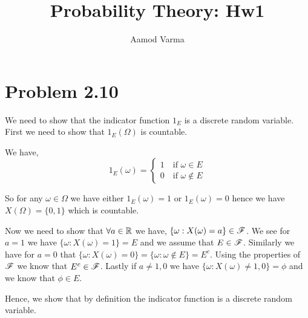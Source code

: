 \documentclass[a4paper]{report}
\title{Probability Theory: Hw1}
\author{Aamod Varma}
\begin{document}
\maketitle
\date{}

\section*{Problem 2.10}
We need to show that the indicator function $1_E$ is a discrete random variable. First we need to show that $1_E(\Omega)$ is countable. 

\vspace{1em}

We have, 
$$ 1_E(\omega) = \begin{cases} 1 \quad \text{if } \omega \in E \\ 0 \quad \text{if } \omega \not \in E \end{cases} $$ 

So for any $\omega \in \Omega$ we have either  $1_E(\omega) = 1$ or $1_E(\omega) = 0$ hence we have  $X(\Omega) = \{0, 1\}$  which is countable. 

\vspace{1em}

Now we need to show that $\forall a \in \mathbb{R}$ we have, $\{ \omega: X(\omega) = a\}  \in \mathscr{F}$. We see for $a = 1$  we have $\{\omega : X(\omega) = 1\} = E$ and we assume that $E \in \mathscr{F}$. Similarly we have  for $a = 0$ that $\{\omega : X(\omega) = 0\} = \{\omega: \omega \not \in E\} = E^{c}$. Using the properties of $\mathscr{F}$ we know that  $E^{c} \in \mathscr{F}$. Lastly if $a \ne 1, 0$ we have $\{\omega: X(\omega) \ne 1,0\} = \phi $ and we know that $\phi \in E$.

\vspace{1em}

Hence, we show that by definition the indicator function is a discrete random variable.
\end{document}
